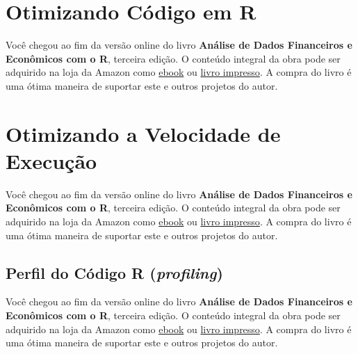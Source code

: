 \documentclass[
  11pt,
]{book}
\newenvironment{pleasebuyit}
{\begin{noteblock}
		
	} {\end{noteblock}}
\begin{document}
\hypertarget{otimizando-cuxf3digo-em-r}{%
\section{Otimizando Código em R}\label{otimizando-cuxf3digo-em-r}}

\begin{pleasebuyit}
Você chegou ao fim da versão online do livro \textbf{Análise de Dados
Financeiros e Econômicos com o R}, terceira edição. O conteúdo integral
da obra pode ser adquirido na loja da Amazon como
\href{https://www.amazon.com.br/dp/B08WNC27ZY}{ebook} ou
\href{https://www.amazon.com/dp/B08WP8CCDB}{livro impresso}. A compra do
livro é uma ótima maneira de suportar este e outros projetos do autor.
\end{pleasebuyit}

\hypertarget{otimizando-a-velocidade-de-execuuxe7uxe3o}{%
\section{Otimizando a Velocidade de Execução}\label{otimizando-a-velocidade-de-execuuxe7uxe3o}}

\begin{pleasebuyit}
Você chegou ao fim da versão online do livro \textbf{Análise de Dados
Financeiros e Econômicos com o R}, terceira edição. O conteúdo integral
da obra pode ser adquirido na loja da Amazon como
\href{https://www.amazon.com.br/dp/B08WNC27ZY}{ebook} ou
\href{https://www.amazon.com/dp/B08WP8CCDB}{livro impresso}. A compra do
livro é uma ótima maneira de suportar este e outros projetos do autor.
\end{pleasebuyit}

\hypertarget{perfil-do-cuxf3digo-r-profiling}{%
\subsection{\texorpdfstring{Perfil do Código R (\emph{profiling})}{Perfil do Código R (profiling)}}\label{perfil-do-cuxf3digo-r-profiling}}

\begin{pleasebuyit}
Você chegou ao fim da versão online do livro \textbf{Análise de Dados
Financeiros e Econômicos com o R}, terceira edição. O conteúdo integral
da obra pode ser adquirido na loja da Amazon como
\href{https://www.amazon.com.br/dp/B08WNC27ZY}{ebook} ou
\href{https://www.amazon.com/dp/B08WP8CCDB}{livro impresso}. A compra do
livro é uma ótima maneira de suportar este e outros projetos do autor.
\end{pleasebuyit}
\end{document}
